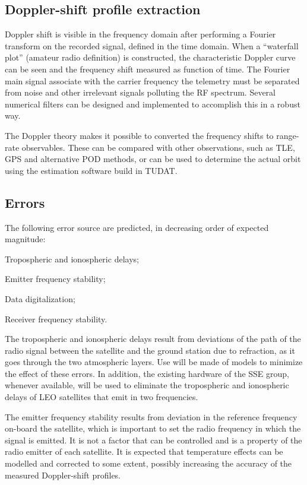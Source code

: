\documentclass[11pt,a4paper,oneside]{article}
\newcommand{\listskip}{0pt}
\newenvironment{itemize*}
{\begin{itemize}
  \setlength{\itemsep}{\listskip}
  \setlength{\parskip}{\listskip}
  \setlength{\parsep}{\listskip}}
{\end{itemize}}
\newcommand{\quotes}[1]{``#1''}
\begin{document}
\subsection{Doppler-shift profile extraction}

Doppler shift is visible in the frequency domain after performing a Fourier transform on the recorded signal, defined in the time domain. When a \quotes{waterfall plot} (amateur radio definition) is constructed, the characteristic Doppler curve can be seen and the frequency shift measured as function of time. The Fourier main signal associate with the carrier frequency the telemetry must be separated from noise and other irrelevant signals polluting the \ac{RF} spectrum. Several numerical filters can be designed and implemented to accomplish this in a robust way.

The Doppler theory makes it possible to converted the frequency shifts to range-rate observables. These can be compared with other observations, such as \ac{TLE}, \ac{GPS} and alternative \ac{POD} methods, or can be used to determine the actual orbit using the estimation software build in \ac{TUDAT}.



\subsection{Errors}

The following error source are predicted, in decreasing order of expected magnitude:

\begin{itemize*}
\item Tropospheric and ionospheric delays;
\item Emitter frequency stability;
\item Data digitalization;
\item Receiver frequency stability.
\end{itemize*}

The tropospheric and ionospheric delays result from deviations of the path of the radio signal between the satellite and the ground station due to refraction, as it goes through the two atmospheric layers. Use will be made of models to minimize the effect of these errors. In addition, the existing hardware of the \ac{SSE} group, whenever available, will be used to eliminate the tropospheric and ionospheric delays of \ac{LEO} satellites that emit in two frequencies.

The emitter frequency stability results from deviation in the reference frequency on-board the satellite, which is important to set the radio frequency in which the signal is emitted. It is not a factor that can be controlled and is a property of the radio emitter of each satellite. It is expected that temperature effects can be modelled and corrected to some extent, possibly increasing the accuracy of the measured Doppler-shift profiles.
\end{document}
